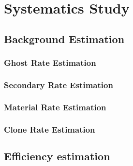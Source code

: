 \section{Systematics Study}
\label{section: systematics study}

\subsection{Background Estimation}
\subsubsection{Ghost Rate Estimation}

\subsubsection{Secondary Rate Estimation}
\subsubsection{Material Rate Estimation}
\subsubsection{Clone Rate Estimation}

\subsection{Efficiency estimation}